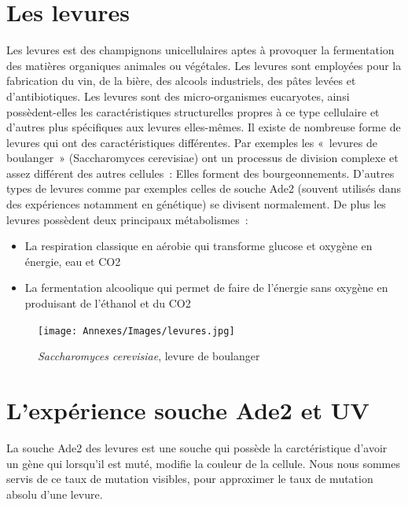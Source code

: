 \label{DefLevures}

\section{Les levures}
Les levures est des champignons unicellulaires aptes à provoquer la fermentation des matières organiques animales ou végétales. Les levures sont employées pour la fabrication du vin, de la bière, des alcools industriels, des pâtes levées et d'antibiotiques. Les levures sont des micro-organismes eucaryotes, ainsi possèdent-elles les caractéristiques structurelles propres à ce type cellulaire et d'autres plus spécifiques aux levures elles-mêmes. Il existe de nombreuse forme de levures qui ont des caractéristiques différentes. Par exemples les « levures de boulanger » (Saccharomyces cerevisiae) ont un processus de division complexe et assez différent des autres cellules : Elles forment des bourgeonnements. D’autres types de levures comme par exemples celles de souche Ade2 (souvent utilisés dans des expériences notamment  en génétique) se divisent normalement. De plus les levures possèdent deux principaux métabolismes :

\begin{itemize}
	\item La respiration classique en aérobie qui transforme glucose et oxygène en énergie, eau et CO2 
	\item La fermentation alcoolique qui permet de faire de l’énergie sans oxygène en produisant de l’éthanol  et du CO2

\end{itemize}

\begin{figure}[H]
  \centering
  \texttt{[image: Annexes/Images/levures.jpg]}
  \caption{\textit{Saccharomyces cerevisiae}, levure de boulanger}
\end{figure}

\section{L'expérience souche Ade2 et UV}

La souche Ade2 des levures est une souche qui possède la carctéristique d'avoir un gène qui lorsqu'il est muté, modifie la couleur de la cellule. Nous nous sommes servis de ce taux de mutation visibles, pour approximer le taux de mutation absolu d'une levure.

